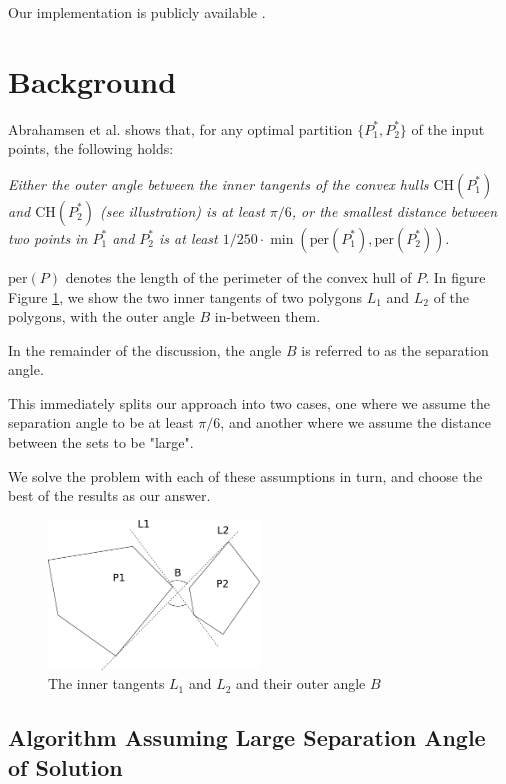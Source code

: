 \documentclass{article}
\newcommand{\figref}[1]{Figure \ref{#1}}
\begin{document}
Our implementation is publicly available \cite{hm18}.

\section{Background}


Abrahamsen et al. \cite{abb17} shows that, for any optimal partition $\{P_1^*, P_2^*\}$ of the input points, the following holds:

\textit{Either the outer angle between the inner tangents of the convex hulls
$\text{CH}(P_1^*)$ and $\text{CH}(P_2^*)$ (see illustration) is at least $\pi / 6$, or the smallest distance between two
points in $P_1^*$ and $P_2^*$ is at least $1/250 \cdot \min(\text{per}(P_1^*), \text{per}(P_2^*))$}. 

$\text{per}(P)$ denotes the length of the perimeter of the convex hull of $P$. In figure \figref{fig:tangent_angle}, we show the two inner tangents of two polygons $L_1$ and $L_2$ of the polygons, with the outer angle $B$ in-between them.

In the remainder of the discussion, the angle $B$ is referred to as the separation angle.

This immediately splits our approach into two cases, one where we assume the separation angle to be at least $\pi / 6$, and another where we assume the distance between the sets to be "large". 


We solve the problem with each of these assumptions in turn, and choose the best of the results as our answer.


\begin{figure}[ht]
    \centering
    \includegraphics[width=0.5\textwidth]{images/inner_angle.png}
    \caption{The inner tangents $L_1$ and $L_2$ and their outer angle $B$}
    \label{fig:tangent_angle}
\end{figure}


\subsection{Algorithm Assuming Large Separation Angle of Solution}
\end{document}
